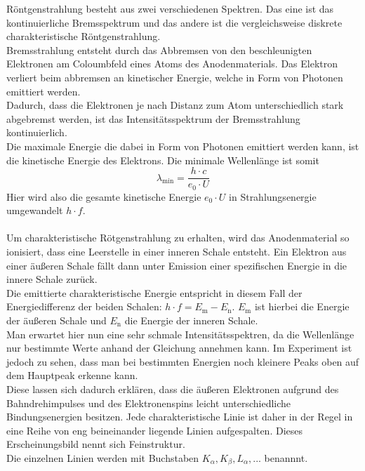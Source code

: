 Röntgenstrahlung besteht aus zwei verschiedenen Spektren. Das 
eine ist das kontinuierliche Bremsspektrum und das andere ist die
vergleichsweise diskrete charakteristische Röntgenstrahlung.\\
Bremsstrahlung entsteht durch das Abbremsen von den beschleunigten
Elektronen am Coloumbfeld eines Atoms des Anodenmaterials. Das Elektron
verliert beim abbremsen an kinetischer Energie, welche in Form von Photonen
emittiert werden.\\
Dadurch, dass die Elektronen je nach Distanz zum Atom unterschiedlich stark
abgebremst werden, ist das Intensitätsspektrum der Bremsstrahlung
kontinuierlich.\\
Die maximale Energie die dabei in Form von Photonen emittiert werden kann, ist die
kinetische Energie des Elektrons. Die minimale Wellenlänge ist somit
\begin{equation}
    \label{eqn:Energiedifferenz}
    \lambda_{\mathrm{min}} = \frac{h\cdot c}{e_0 \cdot U}
\end{equation}
Hier wird also die gesamte kinetische Energie $e_0 \cdot U$ in Strahlungsenergie
umgewandelt $h \cdot f$.\\
\\
Um charakteristische Rötgenstrahlung zu erhalten, wird das Anodenmaterial so ionisiert,
dass eine Leerstelle in einer inneren Schale entsteht. Ein Elektron aus einer äußeren
Schale fällt dann unter Emission einer spezifischen Energie in die innere Schale zurück.\\
Die emittierte charakteristische Energie entspricht in diesem Fall der Energiedifferenz
der beiden Schalen: $h \cdot f = E_{\mathrm{m}} - E_{\mathrm{n}}$. $E_{\mathrm{m}}$ ist hierbei
die Energie der äußeren Schale und $E_{\mathrm{n}}$ die Energie der inneren Schale.\\
Man erwartet hier nun eine sehr schmale Intensitätsspektren, da die Wellenlänge nur bestimmte
Werte anhand der Gleichung annehmen kann. Im Experiment ist jedoch zu sehen, dass man
bei bestimmten Energien noch kleinere Peaks oben auf dem Hauptpeak erkenne kann.\\
Diese lassen sich dadurch erklären, dass die äußeren Elektronen aufgrund des Bahndrehimpulses
und des Elektronenspins leicht unterschiedliche Bindungsenergien besitzen. Jede charakteristische
Linie ist daher in der Regel in eine Reihe von eng beineinander liegende Linien aufgespalten.
Dieses Erscheinungsbild nennt sich Feinstruktur.\\
Die einzelnen Linien werden mit Buchstaben $K_{\alpha}, K_{\beta}, L_{\alpha}, ...$ benannnt. 
